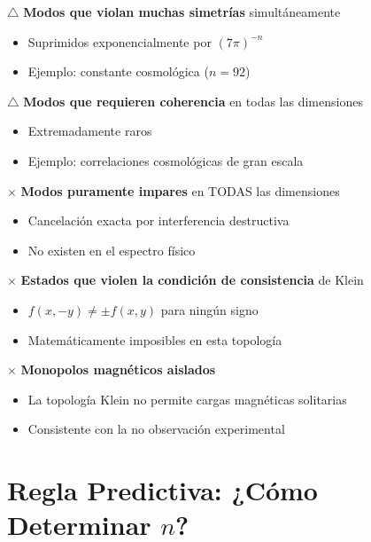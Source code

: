 \begin{tcolorbox}[colback=yellow!10, colframe=yellow!60!black, title=\textbf{FUERTEMENTE SUPRIMIDO}]
$\bigtriangleup$ \textbf{Modos que violan muchas simetrías} simultáneamente
\begin{itemize}
    \item Suprimidos exponencialmente por $(7\pi)^{-n}$
    \item Ejemplo: constante cosmológica ($n=92$)
\end{itemize}

$\bigtriangleup$ \textbf{Modos que requieren coherencia} en todas las dimensiones
\begin{itemize}
    \item Extremadamente raros
    \item Ejemplo: correlaciones cosmológicas de gran escala
\end{itemize}
\end{tcolorbox}

\begin{tcolorbox}[colback=red!10, colframe=red!60!black, title=\textbf{NO PERMITIDO}]
$\times$ \textbf{Modos puramente impares} en TODAS las dimensiones
\begin{itemize}
    \item Cancelación exacta por interferencia destructiva
    \item No existen en el espectro físico
\end{itemize}

$\times$ \textbf{Estados que violen la condición de consistencia} de Klein
\begin{itemize}
    \item $f(x,-y) \neq \pm f(x,y)$ para ningún signo
    \item Matemáticamente imposibles en esta topología
\end{itemize}

$\times$ \textbf{Monopolos magnéticos aislados}
\begin{itemize}
    \item La topología Klein no permite cargas magnéticas solitarias
    \item Consistente con la no observación experimental
\end{itemize}
\end{tcolorbox}


\section{Regla Predictiva: ¿Cómo Determinar $n$?}

